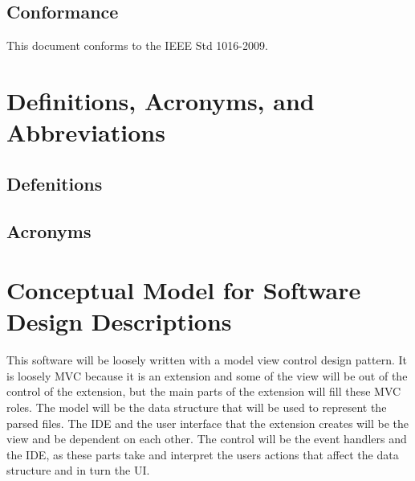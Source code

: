 \documentclass[letterpaper,10pt,titlepage,draftclsnofoot,onecolumn,onesided] {IEEEtran}
\begin{document}
\subsection{Conformance}
This document conforms to the IEEE Std 1016-2009.

\section{Definitions, Acronyms, and Abbreviations}

\subsection{Defenitions}
\newtheorem{Model-View-Controller (MVC)}{A design pattern assigns objects in an application one of three roles: model, view, or controller. The pattern defines not only the roles objects play in the application, it defines the way objects communicate with each other. Each of the three types of objects is separated from the others by abstract boundaries and communicates with objects of the other types across those boundaries. The collection of objects of a certain MVC type in an application is sometimes referred to as a layer—for example, model layer.\cite{appleMVC}}
\newtheorem{Integrated Development Environment}{A software application that provides comprehensive facilities to computer programmers for software development}
\newtheorem{dictionary}{An abstract data type composed of a collection of (key, value) pairs, such that each possible key appears at most once in the collection.}

\subsection{Acronyms}
\newtheorem{VSC}{An acronym of Visual Studio Code. Visual Studio Code is the IDE for which the postal extension is being built.}
\newtheorem{IDE}{An acronym of Integrated Development Environment.}
\newtheorem{UI}{An acronym of User Interface}
\newtheorem{MVC}{Model-View-Controller}


\section{Conceptual Model for Software Design Descriptions}
This software will be loosely written with a model view control design pattern.
It is loosely MVC because it is an extension and some of the view will be out of the control of the extension, but the main parts of the extension will fill these MVC roles.
The model will be the data structure that will be used to represent the parsed files. 
The IDE and the user interface that the extension creates will be the view and be dependent on each other.
The control will be the event handlers and the IDE, as these parts take and interpret the users actions that affect the data structure and in turn the UI.
\end{document}
